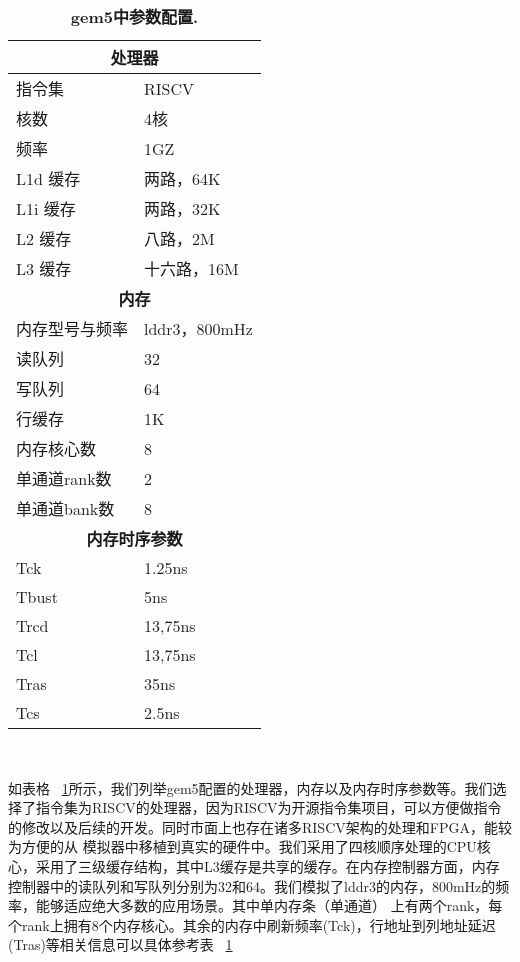\begin{table}[htp]
    \centering
    \footnotesize
    \caption{\textbf{gem5中参数配置.}}
    \label{t:gem5-config}
    \begin{tabular}{p{3.25cm}<{\centering} p{3.25cm}<{\centering} }
    \toprule
    \multicolumn{2}{c}{\textbf{处理器}} \\ \hline
    指令集              & RISCV    \\
    核数    &   4核 \\
    频率    &   1GZ \\
    L1d 缓存    &   两路，64K   \\
    L1i 缓存    &   两路，32K  \\
    L2 缓存    &   八路，2M  \\
    L3 缓存    &   十六路，16M  \\ \hline
    \multicolumn{2}{c}{\textbf{内存}} \\ \hline
    内存型号与频率    &   lddr3，800mHz \\
    读队列    &   32 \\
    写队列    &   64 \\
    行缓存    &   1K \\
    内存核心数    &   8 \\
    单通道rank数    &   2 \\
    单通道bank数    &   8\\ \hline
    \multicolumn{2}{c}{\textbf{内存时序参数}} \\ \hline
    Tck    &   1.25ns \\
    Tbust    &   5ns \\
    Trcd    &   13,75ns \\
    Tcl   &   13,75ns \\
    Tras    &   35ns \\
    Tcs   &   2.5ns \\
    \bottomrule
    \end{tabular} \\[-5pt]
\end{table}

如表格 ~\ref{t:gem5-config}所示，我们列举gem5配置的处理器，内存以及内存时序参数等。我们选择了指令集为RISCV的处理器，因为RISCV为开源指令集项目，可以方便做指令的修改以及后续的开发。同时市面上也存在诸多RISCV架构的处理和FPGA，能较为方便的从
模拟器中移植到真实的硬件中。我们采用了四核顺序处理的CPU核心，采用了三级缓存结构，其中L3缓存是共享的缓存。在内存控制器方面，内存控制器中的读队列和写队列分别为32和64。我们模拟了lddr3的内存，800mHz的频率，能够适应绝大多数的应用场景。其中单内存条（单通道）
上有两个rank，每个rank上拥有8个内存核心。其余的内存中刷新频率(Tck)，行地址到列地址延迟(Tras)等相关信息可以具体参考表 ~\ref{t:gem5-config}


